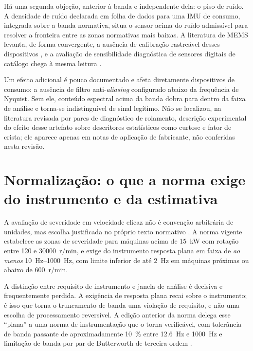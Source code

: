 Há uma segunda objeção, anterior à banda e independente dela: o piso de ruído. A densidade
de ruído declarada em folha de dados para uma IMU de consumo, integrada sobre a banda
normativa, situa o sensor acima do ruído admissível para resolver a fronteira entre as
zonas normativas mais baixas. A literatura de MEMS levanta, de forma convergente, a
ausência de calibração rastreável desses dispositivos \cite{albarbar2008,rodrigues2021},
e a avaliação de sensibilidade diagnóstica de sensores digitais de catálogo chega à mesma
leitura \cite{fidali2024}. 

Um efeito adicional é pouco documentado e afeta diretamente dispositivos de consumo: a
ausência de filtro anti-\emph{aliasing} configurado abaixo da frequência de Nyquist. Sem
ele, conteúdo espectral acima da banda dobra para dentro da faixa de análise e torna-se
indistinguível de sinal legítimo. Não se localizou, na literatura revisada por pares de
diagnóstico de rolamento, descrição experimental do efeito desse artefato sobre descritores
estatísticos como curtose e fator de crista; ele aparece apenas em notas de aplicação de
fabricante, não conferidas nesta revisão.

\section{Normalização: o que a norma exige do instrumento e da estimativa}
\label{sec:rev-norma}

A avaliação de severidade em velocidade eficaz não é convenção arbitrária de unidades, mas
escolha justificada no próprio texto normativo \cite{iso208163_2022}. A norma vigente
estabelece as zonas de severidade para máquinas acima de \SI{15}{\kilo\watt} com rotação
entre \num{120} e \num{30000}~r/min, e exige do instrumento resposta plana em faixa de
\emph{ao menos} \SIrange{10}{1000}{\hertz}, com limite inferior de até \SI{2}{\hertz} em
máquinas próximas ou abaixo de \num{600}~r/min.

A distinção entre requisito de instrumento e janela de análise é decisiva e frequentemente
perdida. A exigência de resposta plana recai sobre o instrumento; é isso que torna o
truncamento de banda uma violação de requisito, e não uma escolha de processamento
reversível. A edição anterior da norma delega esse ``plana'' a uma norma de instrumentação
que o torna verificável, com tolerância de banda passante de aproximadamente
\SI{10}{\percent} entre \SI{12,6}{\hertz} e \SI{1000}{\hertz} e limitação de banda por par
de Butterworth de terceira ordem \cite{iso2954_2012}.

